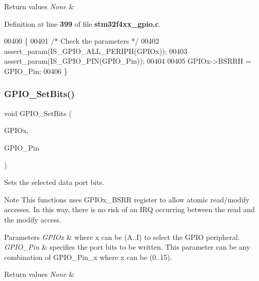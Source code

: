 \begin{DoxyRetVals}{Return values}
{\em None} & \\
\hline
\end{DoxyRetVals}


Definition at line \textbf{ 399} of file \textbf{ stm32f4xx\+\_\+gpio.\+c}.


\begin{DoxyCode}
00400 \{
00401   \textcolor{comment}{/* Check the parameters */}
00402   assert_param(IS_GPIO_ALL_PERIPH(GPIOx));
00403   assert_param(IS_GPIO_PIN(GPIO\_Pin));
00404 
00405   GPIOx->BSRRH = GPIO\_Pin;
00406 \}
\end{DoxyCode}
\mbox{\label{group__GPIO__Group2_ga9e1352eed7c6620e18af2d86f6b6ff8e}} 
\subsubsection{G\+P\+I\+O\+\_\+\+Set\+Bits()}
{\footnotesize\ttfamily void G\+P\+I\+O\+\_\+\+Set\+Bits (\begin{DoxyParamCaption}\item[{\textbf{ G\+P\+I\+O\+\_\+\+Type\+Def} $\ast$}]{G\+P\+I\+Ox,  }\item[{uint16\+\_\+t}]{G\+P\+I\+O\+\_\+\+Pin }\end{DoxyParamCaption})}



Sets the selected data port bits. 

\begin{DoxyNote}{Note}
This functions uses G\+P\+I\+Ox\+\_\+\+B\+S\+RR register to allow atomic read/modify accesses. In this way, there is no risk of an I\+RQ occurring between the read and the modify access. 
\end{DoxyNote}

\begin{DoxyParams}{Parameters}
{\em G\+P\+I\+Ox} & where x can be (A..I) to select the G\+P\+IO peripheral. \\
\hline
{\em G\+P\+I\+O\+\_\+\+Pin} & specifies the port bits to be written. This parameter can be any combination of G\+P\+I\+O\+\_\+\+Pin\+\_\+x where x can be (0..15). \\
\hline
\end{DoxyParams}

\begin{DoxyRetVals}{Return values}
{\em None} & \\
\hline
\end{DoxyRetVals}


